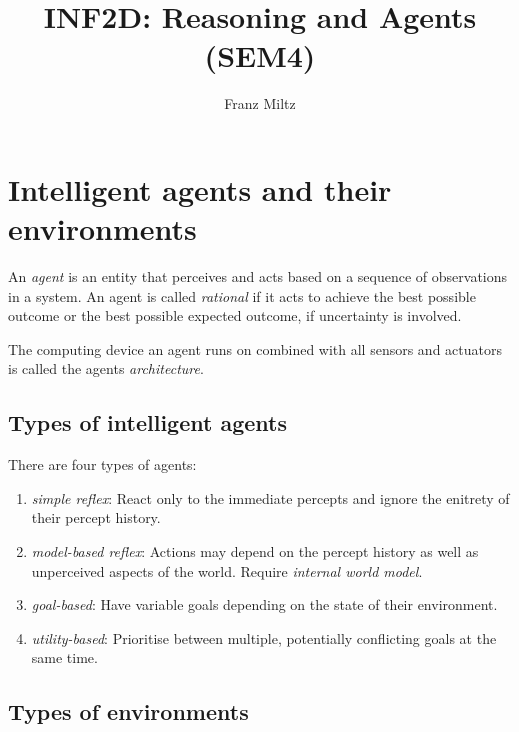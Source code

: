 \documentclass{article}
\title{INF2D: Reasoning and Agents (SEM4)}
\author{Franz Miltz}
\begin{document}
\maketitle
\tableofcontents
\pagebreak

\section{Intelligent agents and their environments}

\begin{definition}
    An \emph{agent} is an entity that perceives and
    acts based on a sequence of observations in a system.
    An agent is called \emph{rational} if it acts to achieve
    the best possible outcome or the best possible expected
    outcome, if uncertainty is involved.
    
    The computing device an agent runs on combined with all sensors and actuators
    is called the agents \emph{architecture}.
\end{definition}

\subsection{Types of intelligent agents}

\begin{definition}
    There are four types of agents:
    \begin{enumerate}
        \item \emph{simple reflex}: React only to the immediate percepts and ignore
        the enitrety of their percept history.
        \item \emph{model-based reflex}: Actions may depend on the percept history
        as well as unperceived aspects of the world. Require \emph{internal world
        model}.
        \item \emph{goal-based}: Have variable goals depending on the state of their
        environment.
        \item \emph{utility-based}: Prioritise between multiple, potentially conflicting
        goals at the same time.
    \end{enumerate}
\end{definition}

\subsection{Types of environments}
\end{document}
